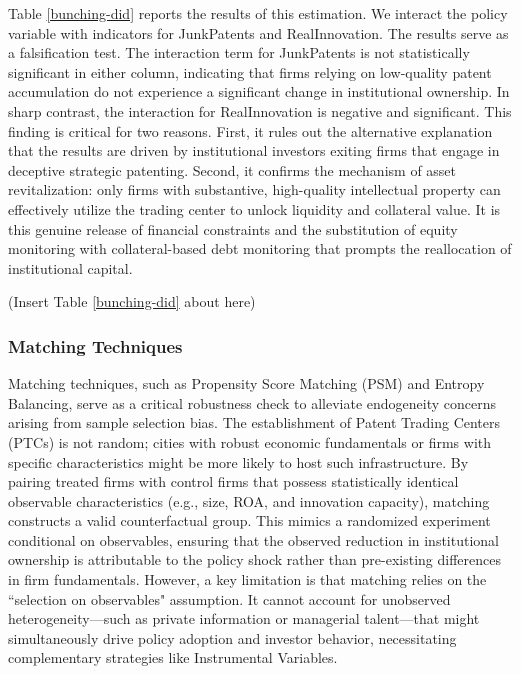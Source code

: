 \documentclass[12pt,a4paper]{article}
\begin{document}
Table \ref{bunching-did} reports the results of this estimation. We interact the policy variable with indicators for JunkPatents and RealInnovation. The results serve as a falsification test. The interaction term for JunkPatents is not statistically significant in either column, indicating that firms relying on low-quality patent accumulation do not experience a significant change in institutional ownership. In sharp contrast, the interaction for RealInnovation is negative and significant. This finding is critical for two reasons. First, it rules out the alternative explanation that the results are driven by institutional investors exiting firms that engage in deceptive strategic patenting. Second, it confirms the mechanism of asset revitalization: only firms with substantive, high-quality intellectual property can effectively utilize the trading center to unlock liquidity and collateral value. It is this genuine release of financial constraints and the substitution of equity monitoring with collateral-based debt monitoring that prompts the reallocation of institutional capital.

\begin{center}
    (Insert Table \ref{bunching-did} about here)
\end{center}


\subsubsection{Matching Techniques}
Matching techniques, such as Propensity Score Matching (PSM) and Entropy Balancing, serve as a critical robustness check to alleviate endogeneity concerns arising from sample selection bias. The establishment of Patent Trading Centers (PTCs) is not random; cities with robust economic fundamentals or firms with specific characteristics might be more likely to host such infrastructure. By pairing treated firms with control firms that possess statistically identical observable characteristics (e.g., size, ROA, and innovation capacity), matching constructs a valid counterfactual group. This mimics a randomized experiment conditional on observables, ensuring that the observed reduction in institutional ownership is attributable to the policy shock rather than pre-existing differences in firm fundamentals. However, a key limitation is that matching relies on the ``selection on observables" assumption. It cannot account for unobserved heterogeneity—such as private information or managerial talent—that might simultaneously drive policy adoption and investor behavior, necessitating complementary strategies like Instrumental Variables.
\end{document}

